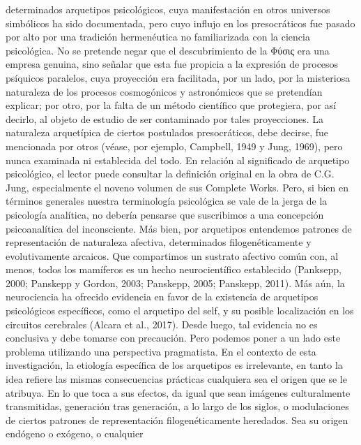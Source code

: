 \documentclass[a4paper]{article}
\begin{document}
determinados arquetipos psicológicos, cuya manifestación en otros universos
simbólicos ha sido documentada, pero cuyo influjo en los presocráticos fue
pasado por alto por una tradición hermenéutica no familiarizada con la ciencia
psicológica. No se pretende negar que el descubrimiento de la Φύσις era una
empresa genuina, sino señalar que esta fue propicia a la expresión de procesos
psíquicos paralelos, cuya proyección era facilitada, por un lado, por la
misteriosa naturaleza de los procesos cosmogónicos y astronómicos que se
pretendían explicar; por otro, por la falta de un método científico que
protegiera, por así decirlo, al objeto de estudio de ser contaminado por tales
proyecciones. La naturaleza arquetípica de ciertos postulados presocráticos,
debe decirse, fue mencionada por otros (véase, por ejemplo, Campbell, 1949 y
Jung, 1969), pero nunca examinada ni establecida del todo. En relación al
significado de arquetipo psicológico, el lector puede consultar la definición
original en la obra de C.G. Jung, especialmente el noveno volumen de sus
Complete Works. Pero, si bien en términos generales nuestra terminología
psicológica se vale de la jerga de la psicología analítica, no debería pensarse
que suscribimos a una concepción psicoanalítica del inconsciente. Más bien, por
arquetipos entendemos patrones de representación de naturaleza afectiva,
determinados filogenéticamente y evolutivamente arcaicos. Que compartimos un
sustrato afectivo común con, al menos, todos los mamíferos es un hecho
neurocientífico establecido (Panksepp, 2000; Panskepp y Gordon, 2003; Panskepp,
2005; Panskepp, 2011). Más aún, la neurociencia ha ofrecido evidencia en favor
de la existencia de arquetipos psicológicos específicos, como el arquetipo del
self, y su posible localización en los circuitos cerebrales (Alcara et al.,
2017). Desde luego, tal evidencia no es conclusiva y debe tomarse con
precaución. Pero podemos poner a un lado este problema utilizando una
perspectiva pragmatista. En el contexto de esta investigación, la etiología
específica de los arquetipos es irrelevante, en tanto la idea refiere las mismas
consecuencias prácticas cualquiera sea el origen que se le atribuya. En lo que
toca a sus efectos, da igual que sean imágenes culturalmente transmitidas,
generación tras generación, a lo largo de los siglos, o modulaciones de ciertos
patrones de representación filogenéticamente heredados. Sea su origen endógeno o
exógeno, o cualquier
\end{document}
